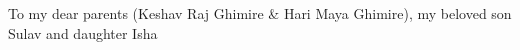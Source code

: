 To my dear parents (Keshav Raj Ghimire \& Hari Maya Ghimire), my beloved son Sulav and daughter Isha 